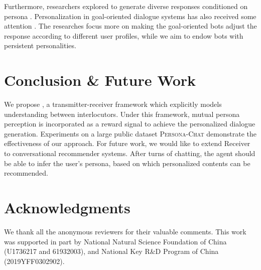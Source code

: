 \documentclass[11pt,a4paper]{article}
\begin{document}
Furthermore, researchers explored to generate diverse responses conditioned on persona \cite{song2019diverse,song-aaai2020-generating}. Personalization in goal-oriented dialogue systems has also received some attention \cite{joshi2017personalization,luo2018learning}. The researches focus more on making the goal-oriented bots adjust the response according to different user profiles, while we aim to endow bots with persistent personalities.

\section{Conclusion \& Future Work}

We propose , a transmitter-receiver framework which explicitly models understanding between interlocutors. Under this framework, mutual persona perception is incorporated as a reward signal to achieve the personalized dialogue generation. Experiments on a large public dataset \textsc{Persona-Chat} demonstrate the effectiveness of our approach. For future work, we would like to extend Receiver to conversational recommender systems. After turns of chatting, the agent should be able to infer the user's persona, based on which personalized contents can be recommended.

\section*{Acknowledgments}

We thank all the anonymous reviewers for their valuable comments. This work was supported in part by National Natural Science Foundation of China (U1736217 and 61932003), and National Key R\&D Program of China (2019YFF0302902).




\end{document}
